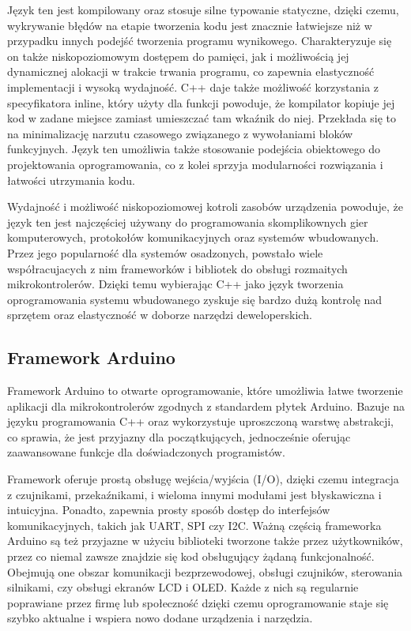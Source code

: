 \documentclass[12pt,twoside,draft]{article}
\begin{document}
Język ten jest kompilowany oraz stosuje silne typowanie statyczne, dzięki czemu, wykrywanie błędów na etapie tworzenia kodu jest znacznie łatwiejsze niż w przypadku innych podejść tworzenia programu wynikowego. Charakteryzuje się on także niskopoziomowym dostępem do pamięci, jak i możliwością jej dynamicznej alokacji w trakcie trwania programu, co zapewnia elastyczność implementacji i wysoką wydajność. C++ daje także możliwość korzystania z specyfikatora inline, który użyty dla funkcji powoduje, że kompilator kopiuje jej kod w zadane miejsce zamiast umieszczać tam wkaźnik do niej. Przekłada się to na minimalizację narzutu czasowego związanego z wywołaniami bloków funkcyjnych. Język ten umożliwia także stosowanie podejścia obiektowego do projektowania oprogramowania, co z kolei sprzyja modularności rozwiązania i łatwości utrzymania kodu.\cite{cppBjarne}

Wydajność i możliwość niskopoziomowej kotroli zasobów urządzenia powoduje, że język ten jest  najczęściej używany do programowania skomplikownych gier
komputerowych, protokołów komunikacyjnych oraz systemów wbudowanych. Przez jego popularność dla systemów osadzonych, powstało wiele współracujacych z nim frameworków i bibliotek do obsługi rozmaitych mikrokontrolerów. Dzięki temu wybierając C++ jako język tworzenia oprogramowania systemu wbudowanego zyskuje się bardzo dużą kontrolę nad sprzętem oraz elastyczność w doborze narzędzi deweloperskich.

\subsection{Framework Arduino}
Framework Arduino\cite{arduinoIntroduction} to otwarte oprogramowanie, które umożliwia łatwe tworzenie aplikacji dla mikrokontrolerów zgodnych z standardem płytek Arduino. Bazuje na języku programowania C++ oraz wykorzystuje uproszczoną warstwę abstrakcji, co sprawia, że jest przyjazny dla początkujących, jednocześnie oferując zaawansowane funkcje dla doświadczonych programistów.

Framework oferuje prostą obsługę wejścia/wyjścia (I/O), dzięki czemu integracja z czujnikami, przekaźnikami, i wieloma innymi modułami jest błyskawiczna i intuicyjna. Ponadto, zapewnia prosty sposób dostęp do interfejsów komunikacyjnych,
takich jak UART, SPI czy I2C. Ważną częścią frameworka Arduino są też przyjazne w użyciu biblioteki tworzone także przez użytkowników, przez co niemal zawsze znajdzie się kod obsługujący żądaną funkcjonalność. Obejmują one obszar komunikacji bezprzewodowej, obsługi czujników, sterowania silnikami, czy obsługi ekranów LCD i OLED. Każde z nich są regularnie poprawiane przez firmę lub społeczność dzięki czemu oprogramowanie staje się szybko aktualne i wspiera nowo dodane urządzenia i narzędzia.
\end{document}
